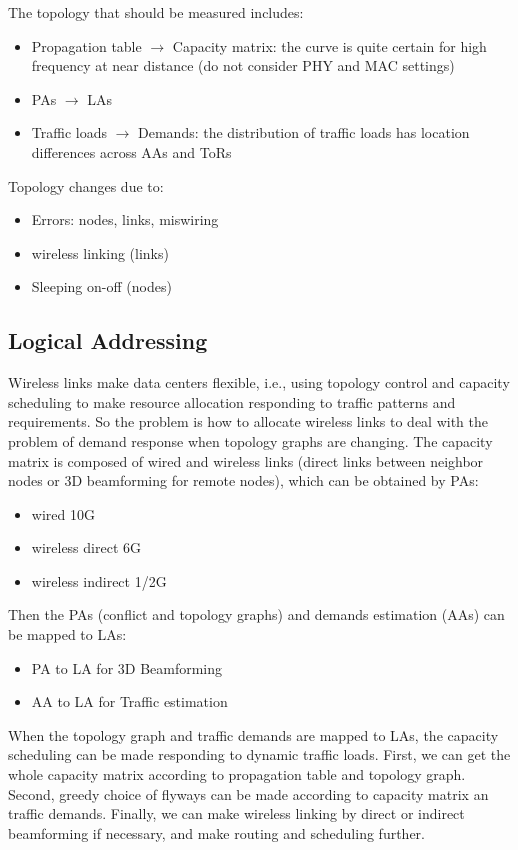 \documentclass[journal,onecolumn,11pt]{IEEEtran}
\begin{document}
The topology that should be measured includes:
\begin{itemize}
  \item Propagation table $\rightarrow$ Capacity matrix: the curve is quite certain for high frequency at near distance (do not consider PHY and MAC settings) \cite{Zhou:2012:MMC:2342356.2342440,Halperin:2011:ADC:2018436.2018442}
  \item PAs $\rightarrow$ LAs
  \item Traffic loads $\rightarrow$ Demands: the distribution of traffic loads has location differences across AAs and ToRs \cite{Halperin:2011:ADC:2018436.2018442,Greenberg:2009:VSF:1592568.1592576}
\end{itemize}

Topology changes due to:
\begin{itemize}
  \item Errors: nodes, links, miswiring
  \item wireless linking (links)
  \item Sleeping on-off (nodes)
\end{itemize}

\subsection{Logical Addressing}

Wireless links make data centers flexible, i.e., using topology control and capacity scheduling to make resource allocation responding to traffic patterns and requirements. So the problem is how to allocate wireless links to deal with the problem of demand response when topology graphs are changing. The capacity matrix is composed of wired and wireless links (direct links between neighbor nodes or 3D beamforming for remote nodes), which can be obtained by PAs:
\begin{itemize}
  \item wired 10G
  \item wireless direct 6G
  \item wireless indirect 1/2G
\end{itemize}

Then the PAs (conflict and topology graphs) and demands estimation (AAs) can be mapped to LAs:
\begin{itemize}
  \item PA to LA for 3D Beamforming
  \item AA to LA for Traffic estimation
\end{itemize}

When the topology graph and traffic demands are mapped to LAs, the capacity scheduling can be made responding to dynamic traffic loads. First, we can get the whole capacity matrix according to propagation table and topology graph. Second, greedy choice of flyways can be made according to capacity matrix an traffic demands. Finally, we can make wireless linking by direct or indirect beamforming if necessary, and make routing and scheduling further.

\renewcommand\refname{References}
%


\end{document}

